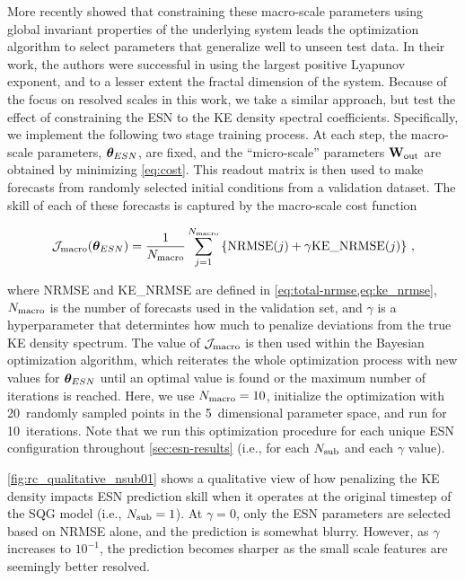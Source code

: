 More recently 
showed that constraining these macro-scale
parameters using global invariant properties of the underlying system leads the
optimization algorithm to select parameters that generalize well to unseen test
data.
In their work, the authors were successful in using the largest positive
Lyapunov exponent, and to a lesser extent the fractal dimension of the system.
Because of the focus on resolved scales in this work, we take a similar
approach, but test the effect of constraining the ESN to the KE density
spectral coefficients.
Specifically, we implement the following two stage training process.
At each step, the macro-scale parameters, $\bm{\theta}_{ESN}$, are fixed, and the
``micro-scale'' parameters $\mathbf{W}_\text{out}$ are obtained by minimizing \cref{eq:cost}.
This readout matrix is then used to make forecasts from randomly selected
initial conditions from a validation dataset.
The skill of each of these forecasts is captured by the macro-scale cost
function
\begin{linenomath*}\begin{equation}
    \mathcal{J}_\text{macro}(\bm{\theta}_{ESN}) = \dfrac{1}{N_\text{macro}}
    \sum_{j=1}^{N_\text{macro}}
    \left\{
        \text{NRMSE}(j) + \gamma \text{KE\_NRMSE}(j)
    \right\}
    \label{eq:macro-cost} \, ,
\end{equation}\end{linenomath*}
where NRMSE and KE\_NRMSE are defined in \cref{eq:total-nrmse,eq:ke_nrmse},
$N_\text{macro}$ is the number of forecasts used in the validation set, and $\gamma$ is
a hyperparameter that determintes how much to penalize deviations
from the true KE density spectrum.
The value of $\mathcal{J}_\text{macro}$ is then used within the Bayesian optimization
algorithm, which reiterates the whole optimization process with new values for
$\bm{\theta}_{ESN}$ until an optimal value is found or the maximum number of
iterations is reached.
Here, we use $N_\text{macro}=10$, initialize the optimization with 20~randomly sampled
points in the 5~dimensional parameter space, and run for 10~iterations.
Note that we run this optimization procedure for each unique ESN configuration
throughout \cref{sec:esn-results} (i.e., for each $N_\text{sub}$ and each $\gamma$
value).

\cref{fig:rc_qualitative_nsub01} shows a qualitative view of how penalizing the
KE density impacts ESN prediction skill when it operates at the original
timestep of the SQG model (i.e., $N_\text{sub}=1$).
At $\gamma=0$, only the ESN parameters are selected based on NRMSE alone, and
the prediction is somewhat blurry.
However, as $\gamma$ increases to $10^{-1}$, the prediction becomes sharper as
the small scale features are seemingly better resolved.

